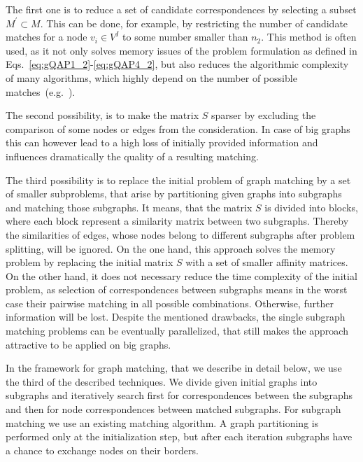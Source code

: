 The first one is to reduce a set of candidate correspondences by selecting a subset $M^\prime\subset M$. This can be done, for example, by restricting the number of candidate matches for a node $v_i\in V^I$ to some number smaller than $n_2$. This method is often used, as it not only solves memory issues of the problem formulation as defined in Eqs.~\eqref{eq:gQAP1_2}-\eqref{eq:gQAP4_2}, but also reduces the algorithmic complexity of many algorithms, which highly depend on the number of possible matches~(e.g.~\cite{Cho2014_Haystack,Cho2010_RRWM,Cho2012_ProgressiveGM, Leordeanu2005_SM}).

The second possibility, is to make the matrix $S$ sparser by excluding the comparison of some nodes or edges from the consideration. In case of big graphs this can however lead to a high loss of initially provided information and influences dramatically the quality of a resulting matching. 

The third possibility is to replace the initial problem of graph matching by a set of smaller subproblems, that arise by partitioning given graphs into subgraphs and matching those subgraphs. It means, that the matrix $S$ is divided into blocks, where each block represent a similarity matrix between two subgraphs. Thereby the similarities of edges, whose nodes belong to different subgraphs after problem splitting, will be ignored. On the one hand, this approach solves the memory problem by replacing the initial matrix $S$ with a set of smaller affinity matrices. On the other hand, it does not necessary reduce the time complexity of the initial problem, as selection of correspondences between subgraphs means in the worst case their pairwise matching in all possible combinations. Otherwise, further information will be lost. Despite the mentioned drawbacks, the single subgraph matching problems can be eventually parallelized, that still makes the approach attractive to be applied on big graphs.

In the framework for graph matching, that we describe in detail below, we use the third of the described techniques. We divide given initial graphs into subgraphs and iteratively search first for correspondences between the subgraphs and then for node correspondences between matched subgraphs. For subgraph matching we use an existing matching algorithm. A graph partitioning is performed only at the initialization step, but after each iteration subgraphs have a chance to exchange nodes on their borders.

